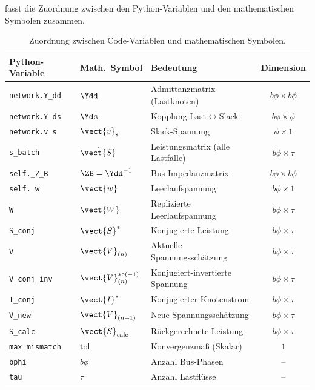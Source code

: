  fasst die Zuordnung zwischen den Python-Variablen und den mathematischen Symbolen zusammen.

\begin{table}[H]
	\centering
	\caption{Zuordnung zwischen Code-Variablen und mathematischen Symbolen.}
	\label{tab:code_math}
	\renewcommand{\arraystretch}{1.3}
	\begin{tabular}{@{}lllc@{}}
		\toprule
		\textbf{Python-Variable} & \textbf{Math.\ Symbol} & \textbf{Bedeutung} & \textbf{Dimension} \\
		\midrule
		\texttt{network.Y\_dd} & $\Ydd$ & Admittanzmatrix (Lastknoten) & $b\phi \times b\phi$ \\
		\texttt{network.Y\_ds} & $\Yds$ & Kopplung Last$\leftrightarrow$Slack & $b\phi \times \phi$ \\
		\texttt{network.v\_s} & $\vect{v}_s$ & Slack-Spannung & $\phi \times 1$ \\
		\texttt{s\_batch} & $\dot{\vect{S}}$ & Leistungsmatrix (alle Lastfälle) & $b\phi \times \tau$ \\
		\texttt{self.\_Z\_B} & $\ZB = \Ydd^{-1}$ & Bus-Impedanzmatrix & $b\phi \times b\phi$ \\
		\texttt{self.\_w} & $\vect{w}$ & Leerlaufspannung & $b\phi \times 1$ \\
		\texttt{W} & $\vect{W}$ & Replizierte Leerlaufspannung & $b\phi \times \tau$ \\
		\texttt{S\_conj} & $\vect{S}^*$ & Konjugierte Leistung & $b\phi \times \tau$ \\
		\texttt{V} & $\vect{V}_{(n)}$ & Aktuelle Spannungsschätzung & $b\phi \times \tau$ \\
		\texttt{V\_conj\_inv} & $\vect{V}_{(n)}^{*\circ(-1)}$ & Konjugiert-invertierte Spannung & $b\phi \times \tau$ \\
		\texttt{I\_conj} & $\vect{I}^*$ & Konjugierter Knotenstrom & $b\phi \times \tau$ \\
		\texttt{V\_new} & $\vect{V}_{(n+1)}$ & Neue Spannungsschätzung & $b\phi \times \tau$ \\
		\texttt{S\_calc} & $\vect{S}_{\text{calc}}$ & Rückgerechnete Leistung & $b\phi \times \tau$ \\
		\texttt{max\_mismatch} & $\text{tol}$ & Konvergenzmaß (Skalar) & $1$ \\
		\texttt{bphi} & $b\phi$ & Anzahl Bus-Phasen & -- \\
		\texttt{tau} & $\tau$ & Anzahl Lastflüsse & -- \\
		\bottomrule
	\end{tabular}
\end{table}

